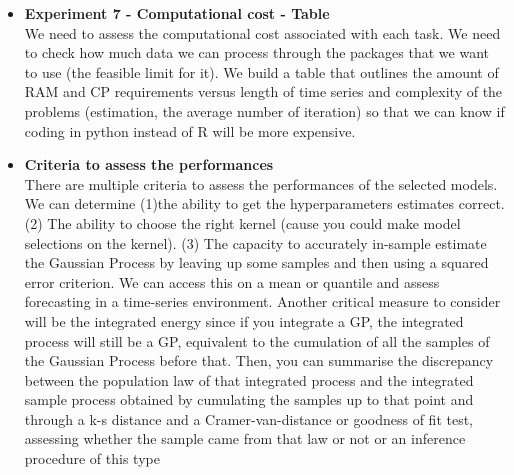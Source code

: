 \documentclass[11pt, a4paper]{article} %
\begin{document}
\begin{itemize}
\item \textbf{Experiment 7 - Computational cost - Table\\}
We need to assess the computational cost associated with each task. We need to check how much data we can process through the packages that we want to use (the feasible limit for it). We build a table that outlines the amount of RAM and CP requirements versus length of time series and complexity of the problems (estimation, the average number of iteration) so that we can know if coding in python instead of R will be more expensive. 


\item \textbf{Criteria to assess the performances}\\
There are multiple criteria to assess the performances of the selected models. We can determine (1)the ability to get the hyperparameters estimates correct. (2) The ability to choose the right kernel (cause you could make model selections on the kernel). (3) The capacity to accurately in-sample estimate the Gaussian Process by leaving up some samples and then using a squared error criterion. We can access this on a mean or quantile and assess forecasting in a time-series environment. Another critical measure to consider will be the integrated energy since if you integrate a GP, the integrated process will still be a GP, equivalent to the cumulation of all the samples of the Gaussian Process before that. Then, you can summarise the discrepancy between the population law of that integrated process and the integrated sample process obtained by cumulating the samples up to that point and through a k-s distance and a Cramer-van-distance  or goodness of fit test, assessing whether the sample came from that law or not or an inference procedure of this type





\end{itemize}
\end{document}
